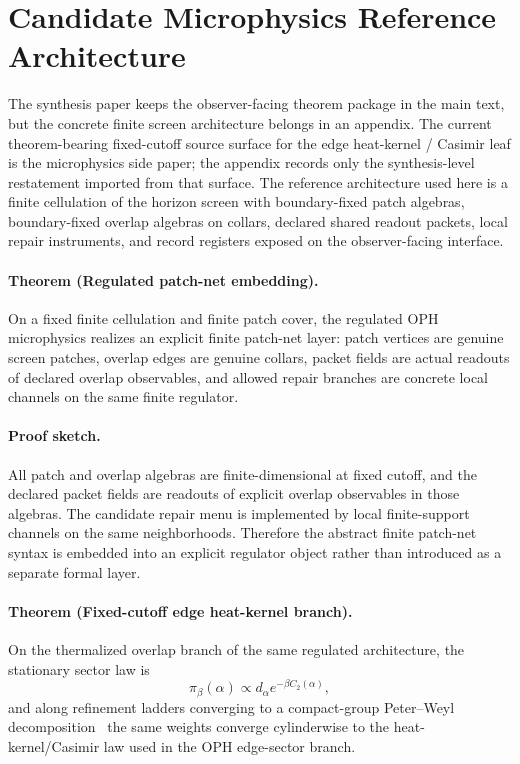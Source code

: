 \section{Candidate Microphysics Reference Architecture}

The synthesis paper keeps the observer-facing theorem package in the main text, but the concrete
finite screen architecture belongs in an appendix. The current theorem-bearing fixed-cutoff
source surface for the edge heat-kernel / Casimir leaf is the microphysics side paper; the
appendix records only the synthesis-level restatement imported from that surface. The reference
architecture used here is a finite cellulation of the horizon screen with boundary-fixed patch
algebras, boundary-fixed overlap algebras on collars, declared shared readout packets, local
repair instruments, and record registers exposed on the observer-facing interface.

\paragraph{Theorem (Regulated patch-net embedding).}
On a fixed finite cellulation and finite patch cover, the regulated OPH microphysics realizes an
explicit finite patch-net layer: patch vertices are genuine screen patches, overlap edges are
genuine collars, packet fields are actual readouts of declared overlap observables, and allowed
repair branches are concrete local channels on the same finite regulator.

\paragraph{Proof sketch.}
All patch and overlap algebras are finite-dimensional at fixed cutoff, and the declared packet
fields are readouts of explicit overlap observables in those algebras. The candidate repair menu
is implemented by local finite-support channels on the same neighborhoods. Therefore the abstract
finite patch-net syntax is embedded into an explicit regulator object rather than introduced as a
separate formal layer.

\paragraph{Theorem (Fixed-cutoff edge heat-kernel branch).}
On the thermalized overlap branch of the same regulated architecture, the stationary sector law is
\[
\pi_\beta(\alpha)\propto d_\alpha e^{-\beta C_2(\alpha)},
\]
and along refinement ladders converging to a compact-group Peter--Weyl decomposition~\cite{peterWeyl27} the same
weights converge cylinderwise to the heat-kernel/Casimir law used in the OPH edge-sector branch.

